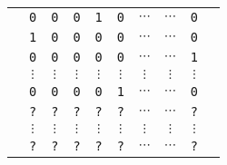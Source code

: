 \begin{table}[!h]
\setlength{\tabcolsep}{1pt} %
\begin{tabular}{|*{10}{c}|} \hline
\rule{0em}{10pt}
& \texttt{0} & \texttt{0} & \texttt{0} & \texttt{1} & \texttt{0} & $\cdots$ & $\cdots$ & \texttt{0} & \\
& \texttt{1} & \texttt{0} & \texttt{0} & \texttt{0} & \texttt{0} & $\cdots$ & $\cdots$ & \texttt{0} & \\
\vspace{-5pt}
& \texttt{0} & \texttt{0} & \texttt{0} & \texttt{0} & \texttt{0} & $\cdots$ & $\cdots$ & \texttt{1} & \\
& $\vdots$ & $\vdots$ & $\vdots$ & $\vdots$ & $\vdots$ & $\vdots$ & $\vdots$ & $\vdots$ & \\
& \texttt{0} & \texttt{0} & \texttt{0} & \texttt{0} & \texttt{1} & $\cdots$ & $\cdots$ & \texttt{0} & \\ \hline
\vspace{-5pt}
& \texttt{?} & \texttt{?} & \texttt{?} & \texttt{?} & \texttt{?} & $\cdots$ & $\cdots$ & \texttt{?} & \rule{0em}{10pt} \\
& $\vdots$ & $\vdots$ & $\vdots$ & $\vdots$ & $\vdots$ & $\vdots$ & $\vdots$ & $\vdots$ &  \\
& \texttt{?} & \texttt{?} & \texttt{?} & \texttt{?} & \texttt{?} & $\cdots$ & $\cdots$ & \texttt{?} & \\ \hline
\end{tabular}
\end{table}


